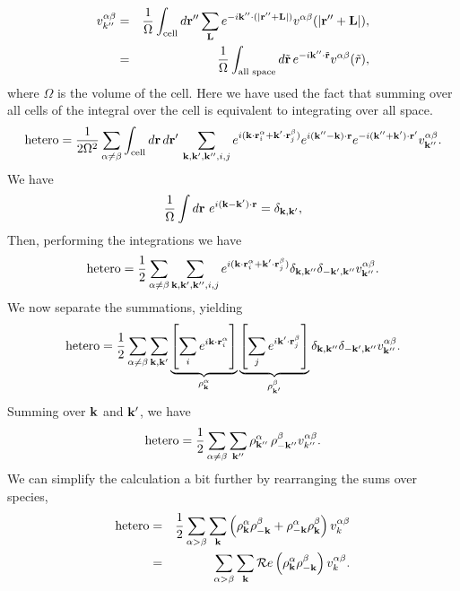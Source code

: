 \begin{eqnarray}
v_{k''}^{\alpha \beta} & = & 
\frac{1}{\Omega} \int_{\text{cell}} d\mathbf{r}'' \sum_{\mathbf{L}}
e^{-i\mathbf{k}''\cdot(|\mathbf{r}''+\mathbf{L}|)} v^{\alpha\beta}(|\mathbf{r}''+\mathbf{L}|), \\
& = & \frac{1}{\Omega} \int_\text{all space} d\tilde{\mathbf{r}} \, 
    e^{-i\mathbf{k}'' \cdot \tilde{\mathbf{r}}} v^{\alpha\beta}(\tilde{r}), \label{eq:vk}
\end{eqnarray}
where $\Omega$ is the volume of the cell. Here we have used the fact
that summing over all cells of the integral over the cell is
equivalent to integrating over all space.
\begin{equation}
\text{hetero} = \frac{1}{2\Omega^2} \sum_{\alpha \neq \beta}
\int_\text{cell} d\mathbf{r} \, d\mathbf{r}' \, \sum_{\mathbf{k}, \mathbf{k}', \mathbf{k}'', i, j}
e^{i(\mathbf{k} \cdot \mathbf{r}_i^\alpha + \mathbf{k}' \cdot\mathbf{r}_j^\beta)} e^{i(\mathbf{k}''-\mathbf{k})\cdot \mathbf{r}}
e^{-i(\mathbf{k}'' + \mathbf{k}')\cdot \mathbf{r}'} v^{\alpha \beta}_{\mathbf{k}''}.
\end{equation}
We have
\begin{equation}
\frac{1}{\Omega} \int d\mathbf{r} \  e^{i(\mathbf{k} -\mathbf{k}')\cdot \mathbf{r}} =
\delta_{\mathbf{k},\mathbf{k}'},
\end{equation}
Then, performing the integrations we have
\begin{eqnarray}
\text{hetero} = \frac{1}{2} \sum_{\alpha \neq \beta}
\sum_{\mathbf{k}, \mathbf{k}', \mathbf{k}'', i, j}
e^{i(\mathbf{k} \cdot \mathbf{r}_i^\alpha + \mathbf{k}' \cdot\mathbf{r}_j^\beta)} \delta_{\mathbf{k},\mathbf{k}''}
\delta_{-\mathbf{k}', \mathbf{k}''} v^{\alpha \beta}_{\mathbf{k}''}.
\end{eqnarray}
We now separate the summations, yielding
\begin{equation}
\text{hetero} = \frac{1}{2} \sum_{\alpha \neq \beta} \sum_{\vk, \vk'}
\underbrace{\left[\sum_i e^{i\vk  \cdot \vr_i^\alpha} \rule{0cm}{0.705cm}
    \right]}_{\rho_\vk^\alpha}
\underbrace{\left[\sum_j e^{i\vk' \cdot \vr_j^\beta} \right]}_{\rho_{\vk'}^\beta}
 \delta_{\vk,\vk''} \delta_{-\vk', \vk''} v^{\alpha
  \beta}_{\vk''}.
\end{equation}
Summing over $\mathbf{k}$ and $\mathbf{k}'$, we have
\begin{equation}
\text{hetero} = \frac{1}{2} \sum_{\alpha \neq \beta} \sum_{\mathbf{k}''}
\rho_{\mathbf{k}''}^\alpha \, \rho_{-\mathbf{k}''}^\beta v_{k''}^{\alpha \beta}.
\end{equation}
We can simplify the calculation a bit further by rearranging the
sums over species,
\begin{eqnarray}
\text{hetero} & = & \frac{1}{2} \sum_{\alpha > \beta} \sum_{\mathbf{k}}
\left(\rho^\alpha_{\mathbf{k}} \rho^\beta_{-\mathbf{k}} + \rho^\alpha_{-\mathbf{k}}
\rho^\beta_{\mathbf{k}}\right) v_{k}^{\alpha\beta} \\
& = & \sum_{\alpha > \beta} \sum_{\mathbf{k}} \mathcal{R}e\left(\rho_{\mathbf{k}}^\alpha
\rho_{-\mathbf{k}}^\beta\right)v_k^{\alpha\beta} .
\end{eqnarray}



